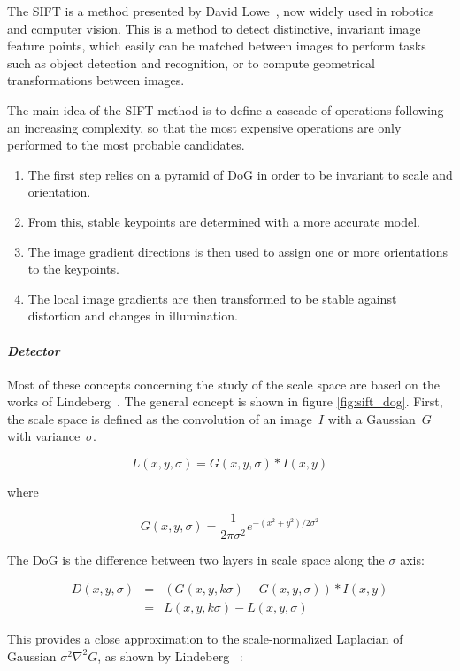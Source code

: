 The \gls{SIFT} is a method presented by David Lowe~\cite{lowe_2004_sift}, now widely used in robotics and computer vision.
This is a method to detect distinctive, invariant image feature points, which easily can be matched between images to perform tasks such as object detection and recognition, or to compute geometrical transformations between images.

The main idea of the \gls{SIFT} method is to define a cascade of operations following an increasing complexity, so that the most expensive operations are only performed to the most probable candidates.
\begin{enumerate}
\item The first step relies on a pyramid of \gls{DoG} in order to be invariant to scale and orientation.
\item From this, stable keypoints are determined with a more accurate model.
\item The image gradient directions is then used to assign one or more orientations to the keypoints.
\item The local image gradients are then transformed to be stable against distortion and changes in illumination.
\end{enumerate}

\clearpage
\paragraph{\emph{Detector}}

Most of these concepts concerning the study of the scale space are based on the works of Lindeberg~\cite{Lindeberg_1994}. The general concept is shown in figure \ref{fig:sift_dog}. First, the scale space is defined as the convolution of an image~$I$ with a Gaussian~$G$ with variance~$\sigma$.

\[ L(x,y,\sigma) = G(x,y,\sigma) * I(x,y) \]

where

\[ G(x,y,\sigma) = \frac{1}{2\pi\sigma^2}e^{-{(x^2+y^2)/2\sigma^2}} \]


The \gls{DoG} is the difference between two layers in scale space along the $\sigma$ axis:

\[
\begin{array}{rcl}
D(x,y,\sigma) & = & (G(x,y, k\sigma) - G(x,y,\sigma)) * I(x,y) \\
 & = & L(x,y,k\sigma) - L(x,y,\sigma)
\end{array}
\] 

This provides a close approximation to the scale-normalized Laplacian of Gaussian $\sigma^2\nabla^2G$, as shown by Lindeberg ~\cite{Lindeberg_1994}:

